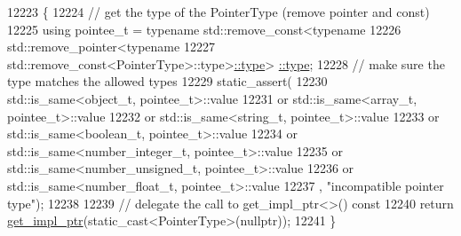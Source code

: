 \begin{DoxyCode}
12223     \{
12224         \textcolor{comment}{// get the type of the PointerType (remove pointer and const)}
12225         \textcolor{keyword}{using} pointee\_t = \textcolor{keyword}{typename} std::remove\_const<\textcolor{keyword}{typename}
12226                           std::remove\_pointer<\textcolor{keyword}{typename}
12227                           std::remove\_const<PointerType>::type>\hyperlink{classstd_1_1conditional_1_1type}{::type}>
      \hyperlink{classnlohmann_1_1basic__json_a2b2d781d7f2a4ee41bc0016e931cadf7}{::type};
12228         \textcolor{comment}{// make sure the type matches the allowed types}
12229         static\_assert(
12230             std::is\_same<object\_t, pointee\_t>::value
12231             or std::is\_same<array\_t, pointee\_t>::value
12232             or std::is\_same<string\_t, pointee\_t>::value
12233             or std::is\_same<boolean\_t, pointee\_t>::value
12234             or std::is\_same<number\_integer\_t, pointee\_t>::value
12235             or std::is\_same<number\_unsigned\_t, pointee\_t>::value
12236             or std::is\_same<number\_float\_t, pointee\_t>::value
12237             , \textcolor{stringliteral}{"incompatible pointer type"});
12238 
12239         \textcolor{comment}{// delegate the call to get\_impl\_ptr<>() const}
12240         \textcolor{keywordflow}{return} \hyperlink{classnlohmann_1_1basic__json_a58b65f595883fb93333423ec5e3bafee}{get\_impl\_ptr}(static\_cast<PointerType>(\textcolor{keyword}{nullptr}));
12241     \}
\end{DoxyCode}
\mbox{\label{classnlohmann_1_1basic__json_afbd800010b67619463c0fce6e74f7878}} 
